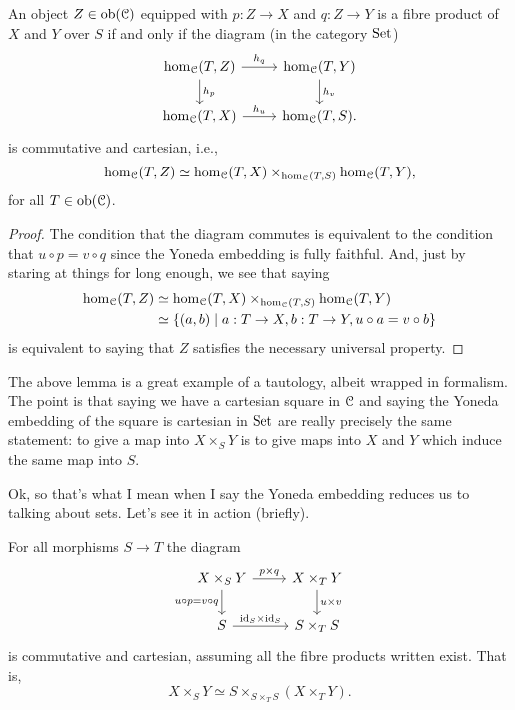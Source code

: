 \begin{lemma}
  \label{magic}
  An object $Z \in \operatorname{ob}(\mathcal{C})$ equipped with $p : Z \to X$ and $q : Z \to
  Y$ is a fibre product of $X$ and $Y$ over $S$ if and only if the
  diagram (in the category $\mathrm{Set}$)
  \[
  \begin{tikzcd}
    \hom_\C(T, Z) \rar{h_q} \dar{h_p} & \hom_\C(T, Y) \dar{h_v}
    \\ \hom_\C(T,X) \rar{h_u} & \hom_\C(T,S).
  \end{tikzcd}
  \]
  is commutative and cartesian, i.e.,
  \[
  \hom_{\mathcal{C}}(T,Z) \simeq \hom_{\mathcal{C}}(T,X) \times_{\hom_{\mathcal{C}}(T,S)}
  \hom_{\mathcal{C}}(T,Y),
  \]
  for all $T \in \operatorname{ob}(\mathcal{C})$.
\end{lemma}

\begin{proof}
  The condition that the diagram commutes is equivalent to the
  condition that $u \circ p = v \circ q$ since the Yoneda embedding is
  fully faithful. And, just by staring at things for long enough, we
  see that saying
  \begin{align*}
  \hom_{\mathcal{C}}(T,Z) &\simeq \hom_{\mathcal{C}}(T,X) \times_{\hom_{\mathcal{C}}(T,S)} \hom_{\mathcal{C}}(T,Y)
  \\ &\simeq \{(a, b) \mid a : T \to X, b : T \to Y, u \circ a = v
  \circ b\}
  \end{align*}
  is equivalent to saying that $Z$ satisfies the necessary universal
  property.
\end{proof}

\begin{remark}
  The above lemma is a great example of a tautology, albeit wrapped in
  formalism. The point is that saying we have a cartesian square in
  $\mathcal{C}$ and saying the Yoneda embedding of the square is cartesian in
  $\mathrm{Set}$ are really precisely the same statement: to give a map into
  $X \times_S Y$ is to give maps into $X$ and $Y$ which induce the
  same map into $S$.
\end{remark}

Ok, so that's what I mean when I say the Yoneda embedding reduces us
to talking about sets. Let's see it in action (briefly).

\begin{lemma}
  For all morphisms $S \to T$ the diagram
  \[
  \begin{tikzcd}
    X \times_S Y \rar{p \times q} \ar{d}[left]{u \circ p = v \circ q}
    & X \times_T Y \dar{u \times v} \\ S \rar{\id_S \times \id_S} & S
    \times_T S
  \end{tikzcd}
  \]
  is commutative and cartesian, assuming all the fibre products
  written exist. That is,
  \[
  X \times_S Y \simeq S \times_{S \times_T S} (X \times_T Y).
  \]
\end{lemma}

